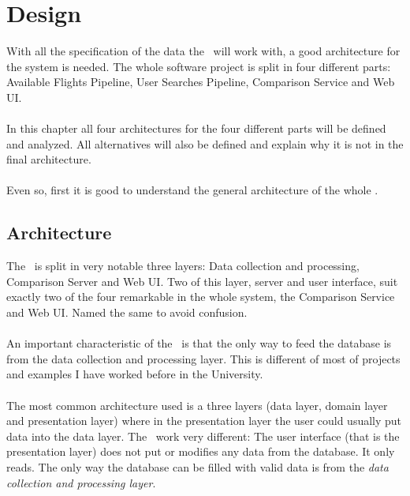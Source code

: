 
\chapter{Design}

\label{chapter06}

With all the specification of the data the \thesis\ will work with, a good architecture for the system is needed. The whole software project is split in four different parts: Available Flights Pipeline, User Searches Pipeline, Comparison Service and Web UI.
\\\\
In this chapter all four architectures for the four different parts will be defined and analyzed. All alternatives will also be defined and explain why it is not in the final architecture.
\\\\
Even so, first it is good to understand the general architecture of the whole \thesis.


\section{Architecture}

The \thesis\ is split in very notable three layers: Data collection and processing, Comparison Server and Web UI. Two of this layer, server and user interface, suit exactly two of the four remarkable in the whole system, the Comparison Service and Web UI. Named the same to avoid confusion.
\\\\
An important characteristic of the \thesis\ is that the only way to feed the database is from the data collection and processing layer. This is different of most of projects and examples I have worked before in the University.
\\\\
The most common architecture used is a three layers (data layer, domain layer and presentation layer) where in the presentation layer the user could usually put data into the data layer. The \thesis\ work very different: The user interface (that is the presentation layer) does not put or modifies any data from the database. It only reads. The only way the database can be filled with valid data is from the \textit{data collection and processing layer}.

